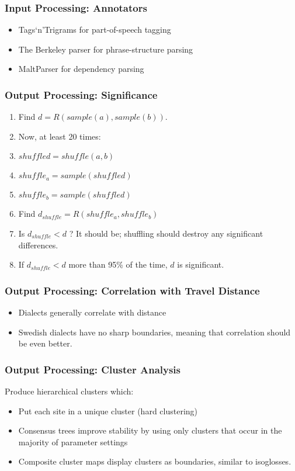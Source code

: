 \documentclass{beamer}
\begin{document}
\begin{frame}
  \frametitle{Input Processing: Annotators}
  \begin{itemize}
  \item Tags`n'Trigrams for part-of-speech tagging
  \item The Berkeley parser for phrase-structure parsing
  \item MaltParser for dependency parsing
  \end{itemize}
\end{frame}
\begin{frame}
  \frametitle{Output Processing: Significance}
  \begin{enumerate}
  \item Find $d = R(sample(a),sample(b))$.
  \item Now, at least 20 times:
  \item $shuffled = shuffle(a,b)$
  \item $shuffle_a = sample(shuffled)$
  \item $shuffle_b = sample(shuffled)$
  \item Find $d_{shuffle} = R(shuffle_a,shuffle_b)$
  \item Is $d_{shuffle} < d$ ? It should be; shuffling should destroy any significant differences.
  \item If $d_{shuffle} < d$ more than 95\% of the time, $d$ is significant.
  \end{enumerate}
\end{frame}
\begin{frame}
  \frametitle{Output Processing: Correlation with Travel Distance}
 \begin{itemize}
  \item Dialects generally correlate with distance
  \item Swedish dialects have no sharp boundaries, meaning that
    correlation should be even better.
 \end{itemize}
\end{frame}
\begin{frame}
  \frametitle{Output Processing: Cluster Analysis}
  Produce hierarchical clusters which:
  \begin{itemize}
  \item Put each site in a unique cluster (hard clustering)
  \item Consensus trees improve stability by using only clusters that
    occur in the majority of parameter settings
  \item Composite cluster maps display clusters as boundaries, similar
    to isoglosses.
  \end{itemize}
\end{frame}
\end{document}
